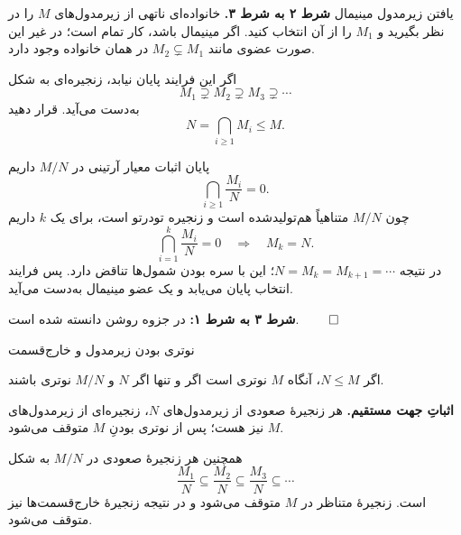 \begin{frame}[t]{یافتن زیرمدول مینیمال}
    \label{lec11:fc-to-minimal-chain}
    \textbf{شرط ۲ به شرط ۳.}
    خانواده‌ای ناتهی از زیرمدول‌های $M$ را در نظر بگیرید و $M_1$ را از آن انتخاب کنید.
    اگر مینیمال باشد، کار تمام است؛ در غیر این صورت عضوی مانند
    $M_2\subsetneq M_1$ در همان خانواده وجود دارد.

    اگر این فرایند پایان نیابد، زنجیره‌ای به شکل
    \[
        M_1\supsetneq M_2\supsetneq M_3\supsetneq\cdots
    \]
    به‌دست می‌آید. قرار دهید
    \[
        N=\bigcap_{i\geqslant1}M_i\leqslant M.
    \]
\end{frame}

\begin{frame}[t]{پایان اثبات معیار آرتینی}
    \label{lec11:fc-to-minimal-end}
    در $M/N$ داریم
    \[
        \bigcap_{i\geqslant1}\frac{M_i}{N}=0.
    \]
    چون $M/N$ متناهیاً هم‌تولیدشده است و زنجیره تودرتو است، برای یک $k$ داریم
    \[
        \bigcap_{i=1}^{k}\frac{M_i}{N}=0
        \quad\Longrightarrow\quad M_k=N.
    \]
    در نتیجه $N=M_k=M_{k+1}=\cdots$؛ این با سره بودن شمول‌ها تناقض دارد.
    پس فرایند انتخاب پایان می‌یابد و یک عضو مینیمال به‌دست می‌آید.

    \medskip
    \textbf{شرط ۳ به شرط ۱:} در جزوه روشن دانسته شده است.
    \hfill\(\qed\)
\end{frame}

\begin{frame}[t]{نوتری بودن زیرمدول و خارج‌قسمت}
    \label{lec11:noetherian-extension}
    \begin{theorem}
        اگر $N\leqslant M$، آنگاه $M$ نوتری است اگر و تنها اگر
        $N$ و $M/N$ نوتری باشند.
    \end{theorem}
    \textbf{اثباتِ جهت مستقیم.}
    هر زنجیرهٔ صعودی از زیرمدول‌های $N$، زنجیره‌ای از زیرمدول‌های $M$ نیز هست؛
    پس از نوتری بودنِ $M$ متوقف می‌شود.

    همچنین هر زنجیرهٔ صعودی در $M/N$ به شکل
    \[
        \frac{M_1}{N}\subseteq\frac{M_2}{N}\subseteq\frac{M_3}{N}\subseteq\cdots
    \]
    است. زنجیرهٔ متناظر در $M$ متوقف می‌شود و در نتیجه زنجیرهٔ خارج‌قسمت‌ها نیز متوقف می‌شود.
\end{frame}

